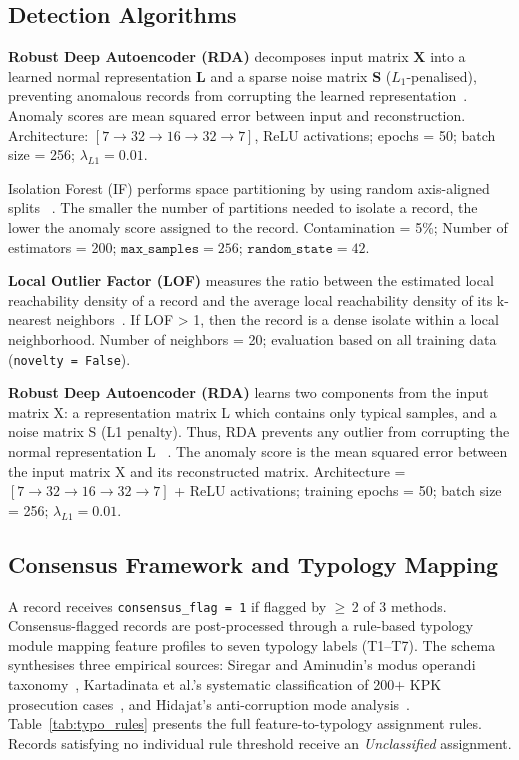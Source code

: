 \documentclass[3p,times,procedia]{elsarticle}
\begin{document}
\subsection{Detection Algorithms}

\textbf{Robust Deep Autoencoder (RDA)} decomposes input matrix $\mathbf{X}$ into a learned normal representation $\mathbf{L}$ and a sparse noise matrix $\mathbf{S}$ ($L_1$-penalised), preventing anomalous records from corrupting the learned representation~\cite{ref27}. Anomaly scores are mean squared error between input and reconstruction. Architecture: $[7 \to 32 \to 16 \to 32 \to 7]$, ReLU activations; epochs = 50; batch size = 256; $\lambda_{L1} = 0.01$.

Isolation Forest (IF) performs space partitioning by using random axis-aligned splits ~\cite{ref24,ref25}. The smaller the number of partitions needed to isolate a record, the lower the anomaly score assigned to the record. Contamination = 5\%; Number of estimators = 200; $\texttt{max\_samples} = 256$; $\texttt{random\_state} = 42$.

\textbf{Local Outlier Factor (LOF)} measures the ratio between the estimated local reachability density of a record and the average local reachability density of its k-nearest neighbors~\cite{ref26}. If LOF > 1, then the record is a dense isolate within a local neighborhood. Number of neighbors = 20; evaluation based on all training data (\texttt{novelty = False}).

\textbf{Robust Deep Autoencoder (RDA)} learns two components from the input matrix X: a representation matrix L which contains only typical samples, and a noise matrix S (L1 penalty). Thus, RDA prevents any outlier from corrupting the normal representation L ~\cite{ref27}. The anomaly score is the mean squared error between the input matrix X and its reconstructed matrix. Architecture = $[7 \to 32 \to 16 \to 32 \to 7]$ + ReLU activations; training epochs = 50; batch size = 256; $\lambda_{L1} = 0.01$.

\subsection{Consensus Framework and Typology Mapping}

A record receives \texttt{consensus\_flag = 1} if flagged by $\geq$\,2 of 3 methods. Consensus-flagged records are post-processed through a rule-based typology module mapping feature profiles to seven typology labels (T1--T7). The schema synthesises three empirical sources: Siregar and Aminudin's modus operandi taxonomy~\cite{ref13}, Kartadinata et al.'s systematic classification of 200$+$ KPK prosecution cases~\cite{ref14}, and Hidajat's anti-corruption mode analysis~\cite{ref12}. Table~\ref{tab:typo_rules} presents the full feature-to-typology assignment rules. Records satisfying no individual rule threshold receive an \textit{Unclassified} assignment.
\end{document}
